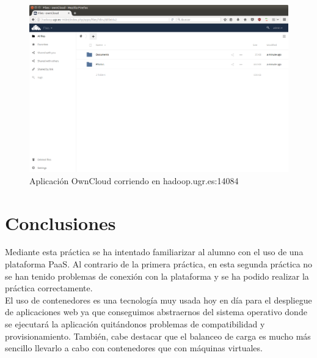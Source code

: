 \begin{figure}[h!]
	\centering
	\includegraphics[width=13cm]{./images/owncloud2}
	\caption{Aplicación OwnCloud corriendo en hadoop.ugr.es:14084} 
	\label{fig:owncloud2}
\end{figure}



\section{Conclusiones}

Mediante esta práctica se ha intentado familiarizar al alumno con el uso de una plataforma PaaS. Al contrario de la primera práctica, en esta segunda práctica no se han tenido problemas de conexión con la plataforma y se ha podido realizar la práctica correctamente. \\

El uso de contenedores es una tecnología muy usada hoy en día para el despliegue de aplicaciones web ya que conseguimos abstraernos del sistema operativo donde se ejecutará la aplicación quitándonos problemas de compatibilidad y provisionamiento. También, cabe destacar que el balanceo de carga es mucho más sencillo llevarlo a cabo con contenedores que con máquinas virtuales. \\




